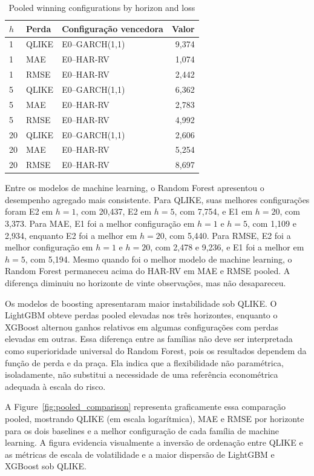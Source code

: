 \documentclass[a4paper,fleqn]{cas-sc}
\begin{document}
\begin{table}[t]
\centering
\caption{Pooled winning configurations by horizon and loss}
\label{tab:pooled_results}
\scriptsize
\setlength{\tabcolsep}{2pt}
\begin{tabular}{@{}p{0.65cm}p{1.05cm}p{2.55cm}r@{}}
\hline
\(h\) & Perda & Configuração vencedora & Valor \\
\hline
1 & QLIKE & E0--GARCH(1,1) & 9,374 \\
1 & MAE & E0--HAR-RV & 1,074 \\
1 & RMSE & E0--HAR-RV & 2,442 \\
5 & QLIKE & E0--GARCH(1,1) & 6,362 \\
5 & MAE & E0--HAR-RV & 2,783 \\
5 & RMSE & E0--HAR-RV & 4,992 \\
20 & QLIKE & E0--GARCH(1,1) & 2,606 \\
20 & MAE & E0--HAR-RV & 5,254 \\
20 & RMSE & E0--HAR-RV & 8,697 \\
\hline
\end{tabular}
\end{table}

Entre os modelos de machine learning, o Random Forest apresentou o desempenho agregado mais consistente. Para QLIKE, suas melhores configurações foram E2 em \(h=1\), com 20,437, E2 em \(h=5\), com 7,754, e E1 em \(h=20\), com 3,373. Para MAE, E1 foi a melhor configuração em \(h=1\) e \(h=5\), com 1,109 e 2,934, enquanto E2 foi a melhor em \(h=20\), com 5,440. Para RMSE, E2 foi a melhor configuração em \(h=1\) e \(h=20\), com 2,478 e 9,236, e E1 foi a melhor em \(h=5\), com 5,194. Mesmo quando foi o melhor modelo de machine learning, o Random Forest permaneceu acima do HAR-RV em MAE e RMSE pooled. A diferença diminuiu no horizonte de vinte observações, mas não desapareceu.

Os modelos de boosting apresentaram maior instabilidade sob QLIKE. O LightGBM obteve perdas pooled elevadas nos três horizontes, enquanto o XGBoost alternou ganhos relativos em algumas configurações com perdas elevadas em outras. Essa diferença entre as famílias não deve ser interpretada como superioridade universal do Random Forest, pois os resultados dependem da função de perda e da praça. Ela indica que a flexibilidade não paramétrica, isoladamente, não substitui a necessidade de uma referência econométrica adequada à escala do risco.

A Figure~\ref{fig:pooled_comparison} representa graficamente essa comparação pooled, mostrando QLIKE (em escala logarítmica), MAE e RMSE por horizonte para os dois baselines e a melhor configuração de cada família de machine learning. A figura evidencia visualmente a inversão de ordenação entre QLIKE e as métricas de escala de volatilidade e a maior dispersão de LightGBM e XGBoost sob QLIKE.
\end{document}
